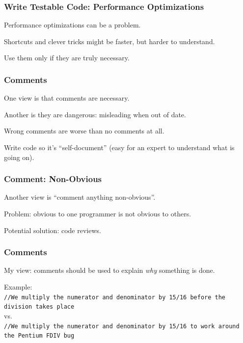 \begin{frame}
\frametitle{Write Testable Code: Performance Optimizations}
\begin{changemargin}{1cm}
Performance optimizations can be a problem.

Shortcuts and clever tricks might be faster, but harder to understand.

Use them only if they are truly necessary.

\end{changemargin}
\end{frame}


\begin{frame}
\frametitle{Comments}
\begin{changemargin}{1cm}
One view is that comments are necessary.

Another is they are dangerous: misleading when out of date.

Wrong comments are worse than no comments at all.

Write code so it's ``self-document'' (easy for an expert to understand what is going on).

\end{changemargin}
\end{frame}

\begin{frame}
\frametitle{Comment: Non-Obvious}
\begin{changemargin}{1cm}
Another view is ``comment anything non-obvious''.

Problem: obvious to one programmer is not obvious to others. 

Potential solution: code reviews. 

\end{changemargin}
\end{frame}

\begin{frame}
\frametitle{Comments}
\begin{changemargin}{1cm}
My view: comments should be used to explain \emph{why} something is done.

Example:\\
\texttt{//We multiply the numerator and denominator by 15/16 before the division takes place}\\
vs.\\
\texttt{//We multiply the numerator and denominator by 15/16 to work around the Pentium FDIV bug}\\


\end{changemargin}
\end{frame}

